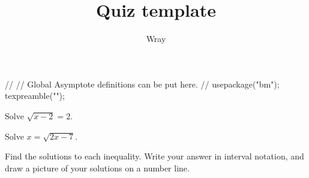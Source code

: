 \documentclass[addpoints, 12pt]{exam}
\title{Quiz template}
\author{Wray}
\begin{document}
\begin{asydef}
//
// Global Asymptote definitions can be put here.
//
usepackage("bm");
texpreamble("\def\V#1{\bm{#1}}");
\end{asydef}



\bigskip

             
\bigskip
\bigskip

\smallskip

\begin{questions}

\question[3]
Solve $\sqrt{x-2} = 2$.


\question[5]
Solve $x = \sqrt{2x - 7}$.


\newpage

\question
Find the solutions to each inequality.  Write your answer in interval notation, and draw a picture of your solutions on a number line.


\end{questions}
\end{document}
